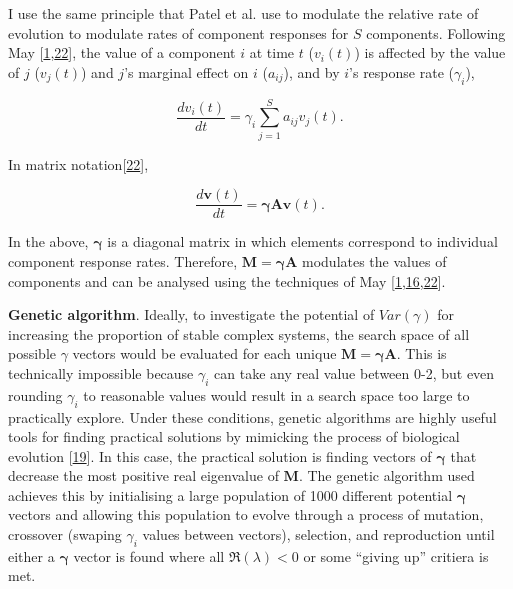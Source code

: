 \documentclass[]{article}
\begin{document}
I use the same principle that Patel et al. use to modulate the relative
rate of evolution to modulate rates of component responses for \(S\)
components. Following May
{[}\protect\hyperlink{ref-May1972}{1},\protect\hyperlink{ref-May1973}{22}{]},
the value of a component \(i\) at time \(t\) (\(v_{i}(t)\)) is affected
by the value of \(j\) (\(v_{j}(t)\)) and \(j\)'s marginal effect on
\(i\) (\(a_{ij}\)), and by \(i\)'s response rate (\(\gamma_{i}\)),

\[\frac{dv_{i}(t)}{dt} = \gamma_{i} \sum_{j=1}^{S}a_{ij}v_{j}(t).\]

In matrix notation{[}\protect\hyperlink{ref-May1973}{22}{]},

\[\frac{d\mathbf{v}(t)}{dt} = \mathbf{\gamma} \mathbf{A}\mathbf{v}(t).\]

In the above, \(\mathbf{\gamma}\) is a diagonal matrix in which elements
correspond to individual component response rates. Therefore,
\(\mathbf{M} =\mathbf{\gamma} \mathbf{A}\) modulates the values of
components and can be analysed using the techniques of May
{[}\protect\hyperlink{ref-May1972}{1},\protect\hyperlink{ref-Ahmadian2015}{16},\protect\hyperlink{ref-May1973}{22}{]}.

\textbf{Genetic algorithm}. Ideally, to investigate the potential of
\(Var(\gamma)\) for increasing the proportion of stable complex systems,
the search space of all possible \(\gamma\) vectors would be evaluated
for each unique \(\mathbf{M = \gamma A}\). This is technically
impossible because \(\gamma_{i}\) can take any real value between 0-2,
but even rounding \(\gamma_{i}\) to reasonable values would result in a
search space too large to practically explore. Under these conditions,
genetic algorithms are highly useful tools for finding practical
solutions by mimicking the process of biological evolution
{[}\protect\hyperlink{ref-Hamblin2013}{19}{]}. In this case, the
practical solution is finding vectors of \(\mathbf{\gamma}\) that
decrease the most positive real eigenvalue of \(\mathbf{M}\). The
genetic algorithm used achieves this by initialising a large population
of 1000 different potential \(\mathbf{\gamma}\) vectors and allowing
this population to evolve through a process of mutation, crossover
(swaping \(\gamma_{i}\) values between vectors), selection, and
reproduction until either a \(\mathbf{\gamma}\) vector is found where
all \(\Re(\lambda) < 0\) or some ``giving up'' critiera is met.
\end{document}
